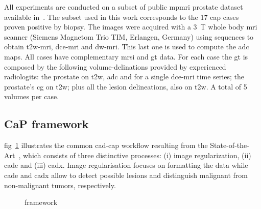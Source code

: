 \documentclass[num-refs]{wiley-article}
\begin{document}
All experiments are conducted on a subset of public \ac{mpmri} prostate dataset
available in~\citep{lemaitre2016dce}. The subset used in this work corresponds
to the 17 \ac{cap} cases proven positive by biopsy. The images were acquired
with a \SI{3}{\tesla} whole body \ac{mri} scanner (Siemens Magnetom Trio TIM,
Erlangen, Germany) using sequences to obtain \ac{t2w}-\ac{mri},
\ac{dce}-\ac{mri} and \ac{dw}-\ac{mri}. This last one is used to compute the
\ac{adc} maps. All cases have complementary \ac{mrsi} and \ac{gt} data.
%
For each case the \ac{gt} is composed by the following volume-delinations
provided by experienced radiologits: the prostate on \ac{t2w}, \ac{adc} and for
a single \ac{dce}-\ac{mri} time series; the prostate's \ac{cg} on \ac{t2w}; plus
all the lesion delineations, also on \ac{t2w}. A total of 5 volumes per case.


\subsection{CaP framework} \label{sec:framework}

\Acl{fig}~\ref{fig:wkfcad} illustrates the common \ac{cad}-\ac{cap} workflow
resulting from the State-of-the-Art~\cite{lemaitre2015computer}, which 
consists of three distinctive processes: (i) image regularization, (ii)
\ac{cade} and (iii) \ac{cadx}. Image regularisation focuses on formatting the data
while \ac{cade} and \ac{cadx} allow to detect possible lesions and distinguish
malignant from non-malignant tumors, respectively.

\begin{figure}
  \centering

\caption{framework}
\label{fig:wkfcad}
\end{figure}
\end{document}
